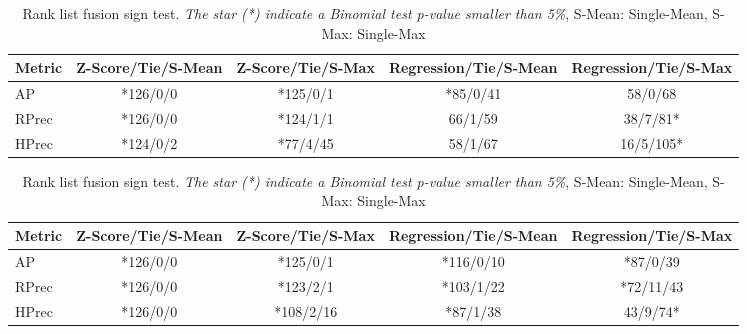 \begin{table}
  \vspace{0.5cm}

\end{table}

\begin{table}
  \centering
  \caption{Rank list fusion sign test. \textit{The star (*) indicate a Binomial test p-value smaller than 5\%}, S-Mean: Single-Mean, S-Max: Single-Max}
  \label{tab:fusion_sign_test}

  \label{tab:fusion_A}
  \begin{tabular}{l c c c c}
    \toprule
    Metric
    & Z-Score/Tie/S-Mean
    & Z-Score/Tie/S-Max
    & Regression/Tie/S-Mean
    & Regression/Tie/S-Max \\
    \midrule
    AP    & *126/0/0 & *125/0/1 & *85/0/41 & 58/0/68 \\
    RPrec & *126/0/0 & *124/1/1 & 66/1/59  & 38/7/81* \\
    HPrec & *124/0/2 & *77/4/45 & 58/1/67  & 16/5/105*\\
    \bottomrule
  \end{tabular}

  \vspace{0.5cm}

  \label{tab:fusion_B}
  \begin{tabular}{l c c c c}
    \toprule
    Metric
    & Z-Score/Tie/S-Mean
    & Z-Score/Tie/S-Max
    & Regression/Tie/S-Mean
    & Regression/Tie/S-Max \\
    \midrule
    AP    & *126/0/0 & *125/0/1  & *116/0/10 & *87/0/39 \\
    RPrec & *126/0/0 & *123/2/1  & *103/1/22 & *72/11/43 \\
    HPrec & *126/0/0 & *108/2/16 & *87/1/38  & 43/9/74*\\
    \bottomrule
  \end{tabular}

\end{table}

